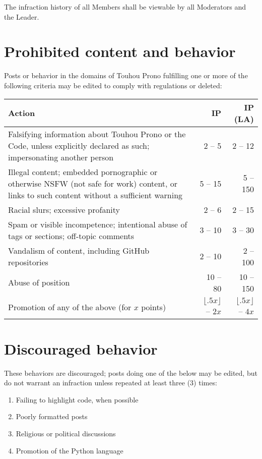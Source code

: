 \documentclass[10pt]{book}
\begin{document}
The infraction history of all Members shall be viewable by all Moderators and the Leader.

\section{Prohibited content and behavior}
\label{sec:procon}

Posts or behavior in the domains of Touhou Prono fulfilling one or more of the following criteria may be edited to comply with regulations or deleted:

\begin{tabular}{|p{6cm}|r|r|}
 \hline
 Action & IP & IP (LA) \\ \hline
 Falsifying information about Touhou Prono or the Code, unless explicitly declared as such; impersonating another person & 2 -- 5 & 2 -- 12 \\
 Illegal content; embedded pornographic or otherwise NSFW (not safe for work) content, or links to such content without a sufficient warning & 5 -- 15 & 5 -- 150 \\
 Racial slurs; excessive profanity & 2 -- 6 & 2 -- 15 \\
 Spam or visible incompetence; intentional abuse of tags or sections; off-topic comments & 3 -- 10 & 3 -- 30 \\
 Vandalism of content, including GitHub repositories & 2 -- 10 & 2 -- 100 \\
 Abuse of position & 10 -- 80 & 10 -- 150 \\
 Promotion of any of the above (for $x$ points) & $\lfloor.5x\rfloor$ -- $2x$ & $\lfloor.5x\rfloor$ -- $4x$ \\ \hline
\end{tabular}

\section{Discouraged behavior}
\label{discon}

These behaviors are discouraged; posts doing one of the below may be edited, but do not warrant an infraction unless repeated at least three (3) times:

\begin{enumerate}
 \item Failing to highlight code, when possible
 \item Poorly formatted posts
 \item Religious or political discussions
 \item Promotion of the Python language
\end{enumerate}
\end{document}
